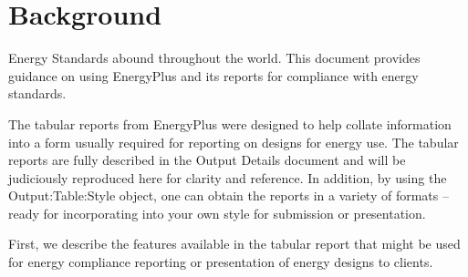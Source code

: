 \section{Background}\label{background}

Energy Standards abound throughout the world. This document provides guidance on using EnergyPlus and its reports for compliance with energy standards.

The tabular reports from EnergyPlus were designed to help collate information into a form usually required for reporting on designs for energy use. The tabular reports are fully described in the Output Details document and will be judiciously reproduced here for clarity and reference. In addition, by using the Output:Table:Style object, one can obtain the reports in a variety of formats -- ready for incorporating into your own style for submission or presentation.

First, we describe the features available in the tabular report that might be used for energy compliance reporting or presentation of energy designs to clients.
